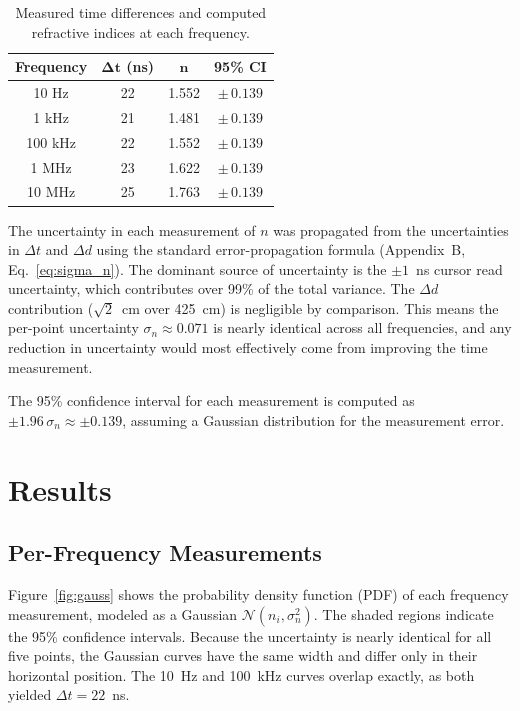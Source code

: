 \documentclass[12pt]{article}
\begin{document}
\begin{table}[H]
\centering
\caption{Measured time differences and computed refractive indices at each frequency.}
\label{tab:data}
\vspace{4pt}
\begin{tabular}{cccc}
\toprule
\rowcolor[gray]{0.9}
\textbf{Frequency} & $\boldsymbol{\Delta t}$ \textbf{(ns)} & $\boldsymbol{n}$ & \textbf{95\% CI} \\
\midrule
10 Hz   & 22 & 1.552 & $\pm\,0.139$ \\
1 kHz   & 21 & 1.481 & $\pm\,0.139$ \\
100 kHz & 22 & 1.552 & $\pm\,0.139$ \\
1 MHz   & 23 & 1.622 & $\pm\,0.139$ \\
10 MHz  & 25 & 1.763 & $\pm\,0.139$ \\
\bottomrule
\end{tabular}
\end{table}

The uncertainty in each measurement of $n$ was propagated from the uncertainties in $\Delta t$ and $\Delta d$ using the standard error-propagation formula (Appendix~B, Eq.~\ref{eq:sigma_n}). The dominant source of uncertainty is the $\pm 1$~ns cursor read uncertainty, which contributes over 99\% of the total variance. The $\Delta d$ contribution ($\sqrt{2}$~cm over 425~cm) is negligible by comparison. This means the per-point uncertainty $\sigma_n \approx 0.071$ is nearly identical across all frequencies, and any reduction in uncertainty would most effectively come from improving the time measurement.

The 95\% confidence interval for each measurement is computed as $\pm 1.96\,\sigma_n \approx \pm 0.139$, assuming a Gaussian distribution for the measurement error.

\section{Results}

\subsection{Per-Frequency Measurements}

Figure~\ref{fig:gauss} shows the probability density function (PDF) of each frequency measurement, modeled as a Gaussian $\mathcal{N}(n_i, \sigma_n^2)$. The shaded regions indicate the 95\% confidence intervals. Because the uncertainty is nearly identical for all five points, the Gaussian curves have the same width and differ only in their horizontal position. The 10~Hz and 100~kHz curves overlap exactly, as both yielded $\Delta t = 22$~ns.
\end{document}
